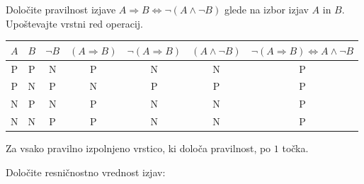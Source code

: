 \documentclass[addpoints,12pt]{exam}
\begin{document}
\begin{questions}

    \newpage
    
    \question[4]
    Določite pravilnost izjave $ A\Rightarrow  B\Leftrightarrow \lnot(A\land \lnot B)$ glede na izbor izjav $A$ in $B$. Upoštevajte vrstni red operacij.

    \begin{solution}[14cm]
        \begin{table}[H]
            \begin{tabular}{ccccccc}
             $A$ & $B$ & $\lnot B$ & $(A\Rightarrow B)$ & $\lnot(A\Rightarrow B)$ & $(A\land \lnot B)$ & $\lnot( A\Rightarrow  B)\Leftrightarrow A\land \lnot B$\\ \hline
             P & P & N & P & N & N & P \\ 
             P & N & P & N & P & P & P \\
             N & P & N & P & N & N & P \\
             N & N & P & P & N & N & P
            \end{tabular}
        \end{table}
        Za vsako pravilno izpolnjeno vrstico, ki določa pravilnost, po $1$ točka.

    \end{solution}




    \question[2]
    Določite resničnostno vrednost izjav:


\end{questions}
\end{document}
